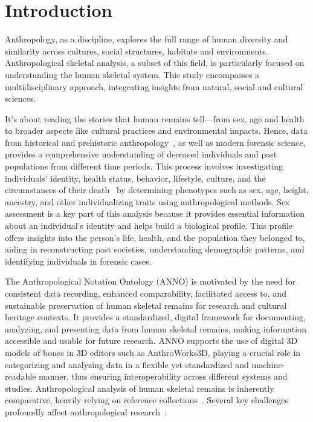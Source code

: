\documentclass[sw]{iosart2x}
\begin{document}
\section{Introduction}\label{sec:introduction}

Anthropology, as a discipline, explores the full range of human diversity and similarity across cultures, social structures, habitats and environments.
Anthropological skeletal analysis, a subset of this field, is particularly focused on understanding the human skeletal system.
This study encompasses a multidisciplinary approach, integrating insights from natural, social and cultural sciences.

It's about reading the stories that human remains tell---from sex, age and health to broader aspects like cultural practices and environmental impacts.
Hence, data from historical and prehistoric anthropology~\cite{prehistoricanthropology}, as well as modern forensic science, provides a comprehensive understanding of deceased individuals and past populations from different time periods.
This process involves investigating individuals' identity, health status, behavior, lifestyle, culture, and the circumstances of their death~\cite{spurensuche} by determining phenotypes such as sex, age, height, ancestry, and other individualizing traits using anthropological methods.
Sex assessment is a key part of this analysis because it provides essential information about an individual's identity and helps build a biological profile.
This profile offers insights into the person's life, health, and the population they belonged to, aiding in reconstructing past societies, understanding demographic patterns, and identifying individuals in forensic cases.

The Anthropological Notation Ontology (ANNO) is motivated by the need for consistent data recording, enhanced comparability, facilitated access to, and sustainable preservation of human skeletal remains for research and cultural heritage contexts.
It provides a standardized, digital framework for documenting, analyzing, and presenting data from human skeletal remains, making information accessible and usable for future research.
ANNO supports the use of digital 3D models of bones in 3D editors such as AnthroWorks3D, playing a crucial role in categorizing and analyzing data in a flexible yet standardized and machine-readable manner, thus ensuring interoperability across different systems and studies.
Anthropological analysis of human skeletal remains is inherently comparative, heavily relying on reference collections~\citep{spurensuche}.
Several key challenges profoundly affect anthropological research~\citep{aw3dcidoc}:
\end{document}
